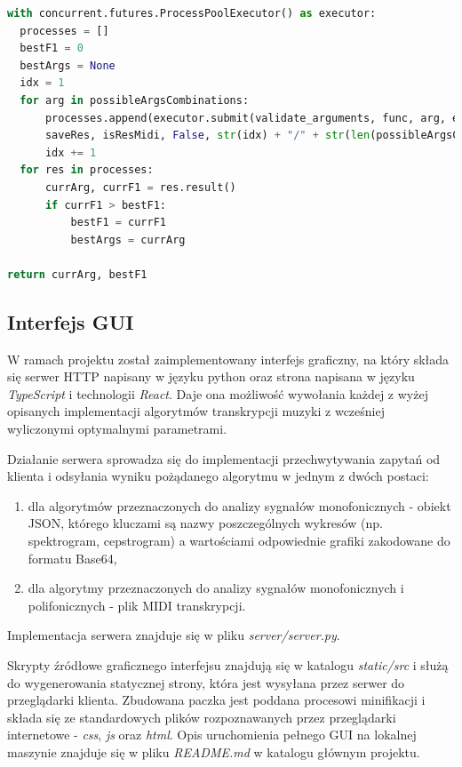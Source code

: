 \documentclass[12pt,a4paper,twoside]{mwart}
\begin{document}
\begin{lstlisting}[language=Python, caption={Algorytm szukający najlepszej kombinacji argumentów dla zadanej funkcji func.}, captionpos=b, label={code:eval:multiproces}, numbers=none]
with concurrent.futures.ProcessPoolExecutor() as executor:
  processes = []
  bestF1 = 0
  bestArgs = None
  idx = 1
  for arg in possibleArgsCombinations:
      processes.append(executor.submit(validate_arguments, func, arg, evalObjects,
      saveRes, isResMidi, False, str(idx) + "/" + str(len(possibleArgsCombinations))))
      idx += 1
  for res in processes:
      currArg, currF1 = res.result()
      if currF1 > bestF1:
          bestF1 = currF1
          bestArgs = currArg

return currArg, bestF1
\end{lstlisting}

\subsection{Interfejs GUI}\label{sec:impl:gui}
W ramach projektu został zaimplementowany interfejs graficzny, na który składa się serwer HTTP napisany w języku python oraz strona napisana w języku \textit{TypeScript} i technologii \textit{React}. Daje ona możliwość wywołania każdej z wyżej opisanych implementacji algorytmów transkrypcji muzyki z wcześniej wyliczonymi optymalnymi parametrami.

Działanie serwera sprowadza się do implementacji przechwytywania zapytań od klienta i odsyłania wyniku pożądanego algorytmu w jednym z dwóch postaci:
\begin{enumerate}
  \item dla algorytmów przeznaczonych do analizy sygnałów monofonicznych - obiekt JSON, którego kluczami są nazwy poszczególnych wykresów (np. spektrogram, cepstrogram) a wartościami odpowiednie grafiki zakodowane do formatu Base64,
  \item dla algorytmy przeznaczonych do analizy sygnałów monofonicznych i polifonicznych - plik MIDI transkrypcji.
\end{enumerate} 
Implementacja serwera znajduje się w pliku \textit{server/server.py}.

Skrypty źródłowe graficznego interfejsu znajdują się w katalogu \textit{static/src} i służą do wygenerowania statycznej strony, która jest wysyłana przez serwer do przeglądarki klienta. Zbudowana paczka jest poddana procesowi minifikacji i składa się ze standardowych plików rozpoznawanych przez przeglądarki internetowe - \textit{css}, \textit{js} oraz \textit{html}. Opis uruchomienia pełnego GUI na lokalnej maszynie znajduje się w pliku \textit{README.md} w katalogu głównym projektu.
\end{document}
